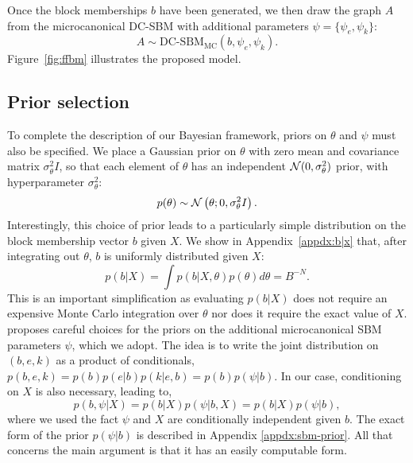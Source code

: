Once the block memberships $b$ have been generated, we then draw the 
graph $A$ from the microcanonical DC-SBM with additional parameters 
$\psi = \{\psi_e, \psi_k\}$:
%
\begin{equation}
	A \sim \textrm{DC-SBM}_{\textrm{MC}} (b, \psi_e, \psi_k).
	\label{eqn:A-generation}
\end{equation}
%
Figure~\ref{fig:ffbm} illustrates the proposed model.

\subsection{Prior selection}

To complete the description of our Bayesian framework,
priors on $\theta$ and $\psi$ must also be specified. 
We place a Gaussian prior on $\theta$ with zero mean
and covariance matrix $\sigma^2_\theta I$, so that
each element of $\theta$ has an independent ${\cal N}(0,\sigma_\theta^2)$
prior, with hyperparameter $\sigma_\theta^2$:
%
\begin{equation}
	p(\theta) \sim \mathcal{N} \left( \theta ; 0, \sigma_\theta^2 I \right).
	\label{eqn:theta-prior}
\end{equation}
%
Interestingly, this choice of prior leads to a particularly
simple distribution on the block membership vector $b$ given $X$.
We show in Appendix~\ref{appdx:b|x} that,
after integrating out $\theta$,
$b$ is uniformly distributed given $X$:
%
\begin{equation}
	p(b | X) = \int p(b | X, \theta) p(\theta) d\theta = B^{-N}.
	\label{eqn:b-pseudo-prior}
\end{equation}
%
This is an important simplification as evaluating $p(b | X)$ does not require an expensive Monte Carlo integration over $\theta$ nor does it require the exact value of $X$. 
\citet{Peixoto-Bayesian-Microcanonical} proposes careful choices for 
the priors on the additional microcanonical SBM parameters $\psi$, which we adopt. 
The idea is to write the joint distribution on $(b, e, k)$ as a product of 
conditionals, $p(b, e, k) = p(b) p(e | b) p(k | e, b)= p(b) p(\psi | b)$. 
In our case, conditioning on $X$ is also necessary, leading to,
%
\begin{equation}
	p(b, \psi | X) = p(b | X) p(\psi | b, X) = p(b | X) p(\psi | b),
	\label{eqn:joint-pseudo-prior}
\end{equation}
%
where we used the fact $\psi$ and $X$ are conditionally 
independent given $b$.  The exact form of the prior
$p(\psi|b)$ is described in Appendix \ref{appdx:sbm-prior}.
All that concerns the main argument is that it has
an easily computable form.
